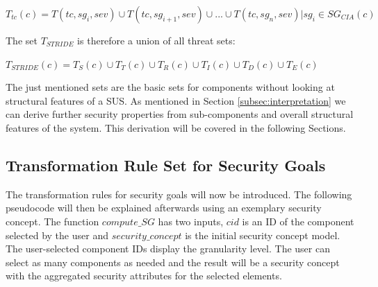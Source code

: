 \begin{theorem} 
$T_{tc}(c) = T(tc, sg_i, sev) \cup T(tc, sg_{i+1}, sev) \cup ... \cup T(tc, sg_n, sev) | sg_i \in SG_{CIA}(c)$
\end{theorem}

The set $T_{STRIDE}$ is therefore a union of all threat sets:

\begin{theorem} 
$T_{STRIDE}(c) = T_S(c) \cup T_T(c) \cup T_R(c) \cup T_I(c) \cup T_D(c) \cup T_E(c)$
\end{theorem}

The just mentioned sets are the basic sets for components without looking at structural features of a SUS. As mentioned in Section \ref{subsec:interpretation} we can derive further security properties from sub-components and overall structural features of the system. This derivation will be covered in the following Sections.

\subsection{Transformation Rule Set for Security Goals}
\label{subsec:sec_goals_rules}

The transformation rules for security goals will now be introduced. The following pseudocode will then be explained afterwards using an exemplary security concept. The function  $compute\_SG$ has two inputs, $cid$ is  an ID of the component selected by the user and $security\_concept$ is the initial security concept model. The user-selected component IDs display the granularity level. The user can select as many components as needed and the result will be a security concept with the aggregated security attributes for the selected elements.

